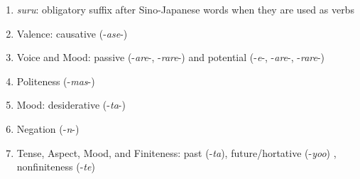 \documentclass[11pt,letterpaper]{article}
\begin{document}
\begin{enumerate}
\item \textit{suru}: obligatory suffix after Sino-Japanese words when they are used as verbs
\item Valence: causative (-\textit{ase}-)
\item Voice and Mood: passive (-\textit{are}-, -\textit{rare}-) and potential (-\textit{e}-, -\textit{are}-, -\textit{rare}-)
\item Politeness (-\textit{mas}-)
\item Mood: desiderative (-\textit{ta}-)
\item Negation (-\textit{n}-)
\item Tense, Aspect, Mood, and Finiteness: past (-\textit{ta}), future/hortative (-\textit{yoo}) \citep[229]{kaiser2013japanese}, nonfiniteness (-\textit{te})
\end{enumerate}
\end{document}
